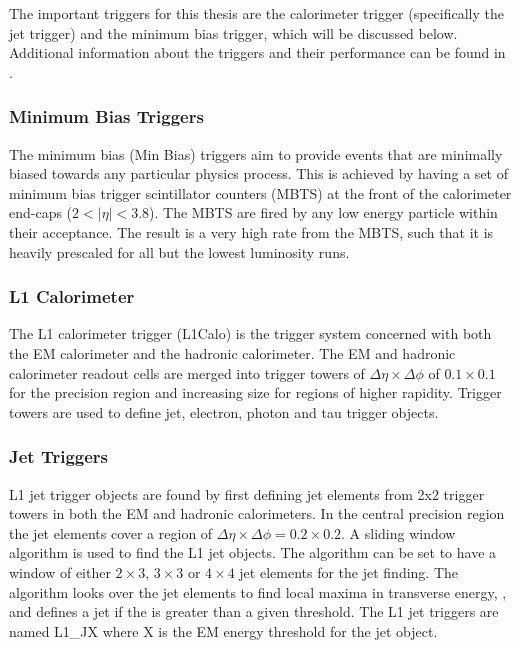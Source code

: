 The important triggers for this thesis are the calorimeter trigger (specifically the jet trigger) and the minimum bias trigger, which will be discussed below.
Additional information about the triggers and their performance can be found in \cite{ref:TriggerPerf}.

\subsubsection{Minimum Bias Triggers}
The minimum bias (Min Bias) triggers aim to provide events that are minimally biased towards any particular physics process. 
This is achieved by having a set of minimum bias trigger scintillator counters (MBTS) at the front of the calorimeter end-caps ($2<|\eta|<3.8$). 
The MBTS are fired by any low energy particle within their acceptance. 
The result is a very high rate from the MBTS, such that it is heavily prescaled for all but the lowest luminosity runs. 



\subsubsection{L1 Calorimeter}
The L1 calorimeter trigger (L1Calo) is the trigger system concerned with both the EM calorimeter and the hadronic calorimeter. 
The EM and hadronic calorimeter readout cells are merged into trigger towers of $\Delta\eta \times \Delta\phi$ of $0.1 \times 0.1$ for the precision region and increasing size for regions of higher rapidity. 
Trigger towers are used to define jet, electron, photon and tau trigger objects.

\subsubsection{Jet Triggers}

L1 jet trigger objects are found by first defining jet elements from 2x2 trigger towers in both the EM and hadronic calorimeters.
In the central precision region the jet elements cover a region of $\Delta\eta \times \Delta\phi = 0.2\times 0.2$. 
A sliding window algorithm is used to find the L1 jet objects. 
The algorithm can be set to have a window of either $2\times3$, $3\times3$ or $4\times4$ jet elements for the jet finding. 
The algorithm looks over the jet elements to find local maxima in transverse energy, \et{}, and defines a jet if the \et{} is  greater than a given threshold. 
The L1 jet triggers are named L1\_JX where X is the EM energy threshold for the jet object.

